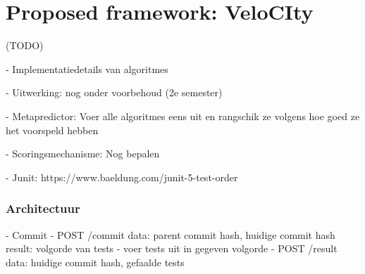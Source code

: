 \chapter{Proposed framework: VeloCIty}
(TODO)

- Implementatiedetails van algoritmes

- Uitwerking: nog onder voorbehoud (2e semester)

- Metapredictor: Voer alle algoritmes eens uit en rangschik ze volgens hoe goed ze het voorspeld hebben

- Scoringsmechanisme: Nog bepalen

- Junit: https://www.baeldung.com/junit-5-test-order

\subsection{Architectuur}
- Commit
- POST /commit
	data: parent commit hash, huidige commit hash
	result: volgorde van tests
- voer tests uit in gegeven volgorde
- POST /result
	data: huidige commit hash, gefaalde tests
	
